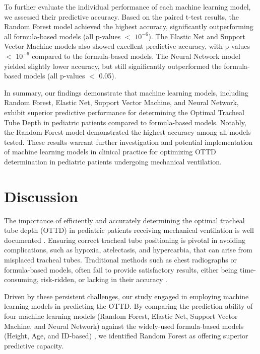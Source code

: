 \documentclass[11pt]{article}
\begin{document}
To further evaluate the individual performance of each machine learning model, we assessed their predictive accuracy. Based on the paired t-test results, the Random Forest model achieved the highest accuracy, significantly outperforming all formula-based models (all p-values $<$ $10^{-6}$). The Elastic Net and Support Vector Machine models also showed excellent predictive accuracy, with p-values $<$ $10^{-6}$ compared to the formula-based models. The Neural Network model yielded slightly lower accuracy, but still significantly outperformed the formula-based models (all p-values $<$ 0.05).

In summary, our findings demonstrate that machine learning models, including Random Forest, Elastic Net, Support Vector Machine, and Neural Network, exhibit superior predictive performance for determining the Optimal Tracheal Tube Depth in pediatric patients compared to formula-based models. Notably, the Random Forest model demonstrated the highest accuracy among all models tested. These results warrant further investigation and potential implementation of machine learning models in clinical practice for optimizing OTTD determination in pediatric patients undergoing mechanical ventilation.

\section*{Discussion}

The importance of efficiently and accurately determining the optimal tracheal tube depth (OTTD) in pediatric patients receiving mechanical ventilation is well documented \cite{Rudin2018StopEB, Ingelse2017EarlyFO, Li2021ACS}. Ensuring correct tracheal tube positioning is pivotal in avoiding complications, such as hypoxia, atelectasis, and hypercarbia, that can arise from misplaced tracheal tubes. Traditional methods such as chest radiographs or formula-based models, often fail to provide satisfactory results, either being time-consuming, risk-ridden, or lacking in their accuracy \cite{Bendavid2022ANM, Park2021DevelopmentOM}. 

Driven by these persistent challenges, our study engaged in employing machine learning models in predicting the OTTD. By comparing the prediction ability of four machine learning models (Random Forest, Elastic Net, Support Vector Machine, and Neural Network) against the widely-used formula-based models (Height, Age, and ID-based) \cite{Zhou2022PredictionOE}, we identified Random Forest as offering superior predictive capacity.
\end{document}
